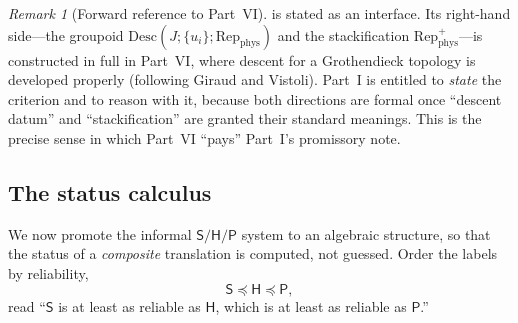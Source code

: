 \documentclass[12pt]{article}
\theoremstyle{definition}
\theoremstyle{remark}
\newtheorem{remark}[theorem]{Remark}
\newcommand{\Repphys}{\mathrm{Rep}_{\mathrm{phys}}}
\newcommand{\Sstat}{\mathsf{S}}
\newcommand{\Hstat}{\mathsf{H}}
\newcommand{\Pstat}{\mathsf{P}}
\newcommand{\stO}{\preceq}
\begin{document}
\begin{remark}[Forward reference to Part~VI]
 is stated as an interface. Its right-hand side---the groupoid
$\mathrm{Desc}(J;\{u_i\};\Repphys)$ and the stackification $\Repphys^+$---is
constructed in full in Part~VI, where descent for a Grothendieck topology is
developed properly (following Giraud and Vistoli). Part~I is entitled to
\emph{state} the criterion and to reason with it, because both directions are
formal once ``descent datum'' and ``stackification'' are granted their standard
meanings. This is the precise sense in which Part~VI ``pays'' Part~I's
promissory note.
\end{remark}

\subsection{The status calculus}

We now promote the informal $\Sstat/\Hstat/\Pstat$ system to an algebraic
structure, so that the status of a \emph{composite} translation is computed, not
guessed. Order the labels by reliability,
\[
  \Sstat \stO \Hstat \stO \Pstat,
\]
read ``$\Sstat$ is at least as reliable as $\Hstat$, which is at least as
reliable as $\Pstat$.''
\end{document}
